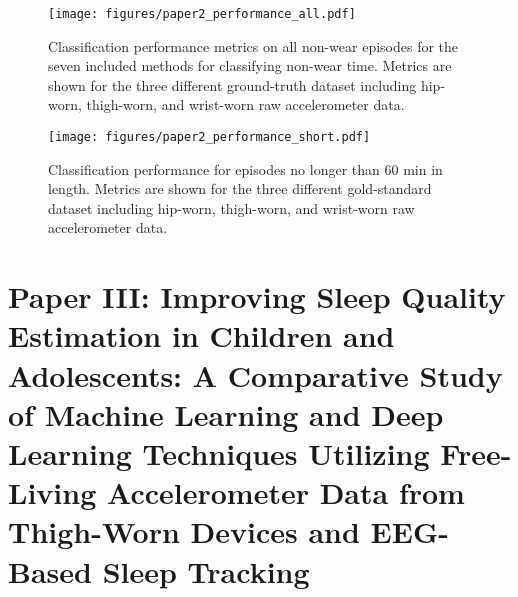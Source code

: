 \documentclass[
  10pt,
]{scrbook}
\begin{document}
\begin{figure}

{\centering \texttt{[image: figures/paper2\_performance\_all.pdf]}

}

\caption{\label{fig-paper2_performance_all}Classification performance
metrics on all non-wear episodes for the seven included methods for
classifying non-wear time. Metrics are shown for the three different
ground-truth dataset including hip-worn, thigh-worn, and wrist-worn raw
accelerometer data.}

\end{figure}

\begin{figure}

{\centering \texttt{[image: figures/paper2\_performance\_short.pdf]}

}

\caption{\label{fig-paper2_performance_short}Classification performance
for episodes no longer than 60 min in length. Metrics are shown for the
three different gold-standard dataset including hip-worn, thigh-worn,
and wrist-worn raw accelerometer data.}

\end{figure}

\newpage

\hypertarget{paper-iii-improving-sleep-quality-estimation-in-children-and-adolescents-a-comparative-study-of-machine-learning-and-deep-learning-techniques-utilizing-free-living-accelerometer-data-from-thigh-worn-devices-and-eeg-based-sleep-tracking}{%
\chapter{Paper III: Improving Sleep Quality Estimation in Children and
Adolescents: A Comparative Study of Machine Learning and Deep Learning
Techniques Utilizing Free-Living Accelerometer Data from Thigh-Worn
Devices and EEG-Based Sleep
Tracking}\label{paper-iii-improving-sleep-quality-estimation-in-children-and-adolescents-a-comparative-study-of-machine-learning-and-deep-learning-techniques-utilizing-free-living-accelerometer-data-from-thigh-worn-devices-and-eeg-based-sleep-tracking}}
\end{document}
